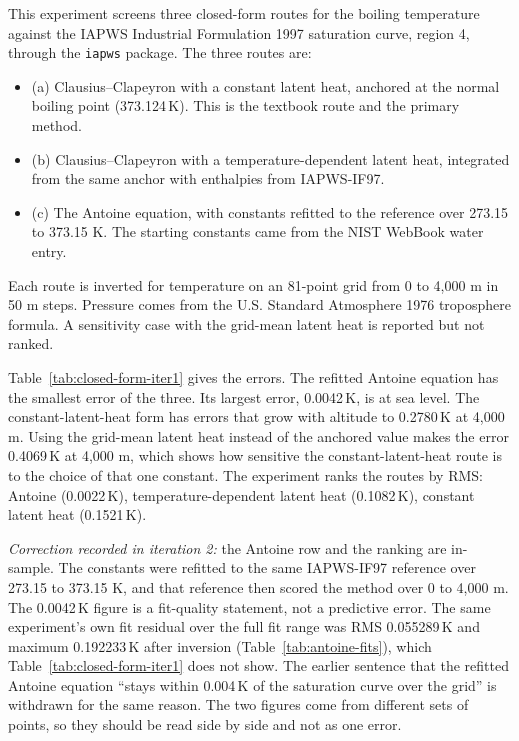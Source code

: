 \documentclass[11pt,letterpaper]{article}
\begin{document}
This experiment screens three closed-form routes for the boiling temperature against the IAPWS Industrial Formulation 1997 saturation curve, region 4, through the \texttt{iapws} package. The three routes are:
\begin{itemize}
\item (a) Clausius--Clapeyron with a constant latent heat, anchored at the normal boiling point (373.124\,K). This is the textbook route and the primary method.
\item (b) Clausius--Clapeyron with a temperature-dependent latent heat, integrated from the same anchor with enthalpies from IAPWS-IF97.
\item (c) The Antoine equation, with constants refitted to the reference over 273.15 to 373.15 K. The starting constants came from the NIST WebBook water entry.
\end{itemize}
Each route is inverted for temperature on an 81-point grid from 0 to 4,000 m in 50 m steps. Pressure comes from the U.S. Standard Atmosphere 1976 troposphere formula. A sensitivity case with the grid-mean latent heat is reported but not ranked.

Table~\ref{tab:closed-form-iter1} gives the errors. The refitted Antoine equation has the smallest error of the three. Its largest error, 0.0042\,K, is at sea level. The constant-latent-heat form has errors that grow with altitude to 0.2780\,K at 4,000 m. Using the grid-mean latent heat instead of the anchored value makes the error 0.4069\,K at 4,000 m, which shows how sensitive the constant-latent-heat route is to the choice of that one constant. The experiment ranks the routes by RMS: Antoine (0.0022\,K), temperature-dependent latent heat (0.1082\,K), constant latent heat (0.1521\,K).

\emph{Correction recorded in iteration 2:} the Antoine row and the ranking are in-sample. The constants were refitted to the same IAPWS-IF97 reference over 273.15 to 373.15 K, and that reference then scored the method over 0 to 4,000 m. The 0.0042\,K figure is a fit-quality statement, not a predictive error. The same experiment's own fit residual over the full fit range was RMS 0.055289\,K and maximum 0.192233\,K after inversion (Table~\ref{tab:antoine-fits}), which Table~\ref{tab:closed-form-iter1} does not show. The earlier sentence that the refitted Antoine equation ``stays within 0.004\,K of the saturation curve over the grid'' is withdrawn for the same reason. The two figures come from different sets of points, so they should be read side by side and not as one error.
\end{document}
